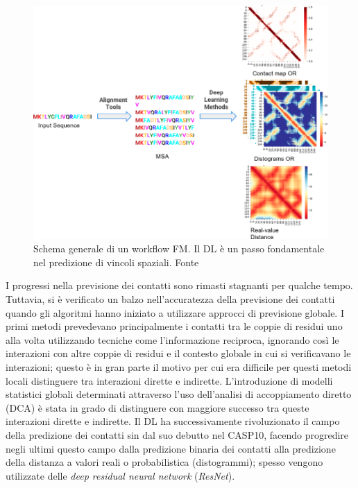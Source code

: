 \begin{figure}[!htb]
	\centering
	\includegraphics[scale=0.6]{images/FM-template.png}
	\caption{Schema generale di un workflow FM. Il DL è un passo fondamentale nel predizione di vincoli spaziali. Fonte\cite{pakhrin2021deep}}
	\label{fig:fm-template-dl}
\end{figure}

\par I progressi nella previsione dei contatti sono rimasti stagnanti per qualche tempo. Tuttavia, si è verificato un balzo nell'accuratezza della previsione dei contatti quando gli algoritmi hanno iniziato a utilizzare approcci di previsione globale. I primi metodi prevedevano principalmente i contatti tra le coppie di residui uno alla volta utilizzando tecniche come l'informazione reciproca, ignorando così le interazioni con altre coppie di residui e il contesto globale in cui si verificavano le interazioni; questo è in gran parte il motivo per cui era difficile per questi metodi locali distinguere tra interazioni dirette e indirette. L'introduzione di modelli statistici globali determinati attraverso l'uso dell'analisi di accoppiamento diretto (DCA) è stata in grado di distinguere con maggiore successo tra queste interazioni dirette e indirette. Il DL ha successivamente rivoluzionato il campo della predizione dei contatti sin dal suo debutto nel CASP10, facendo progredire negli ultimi questo campo dalla predizione binaria dei contatti alla predizione della distanza a valori reali o probabilistica (distogrammi); spesso vengono utilizzate delle \textit{deep residual neural network} (\textit{ResNet}).  

